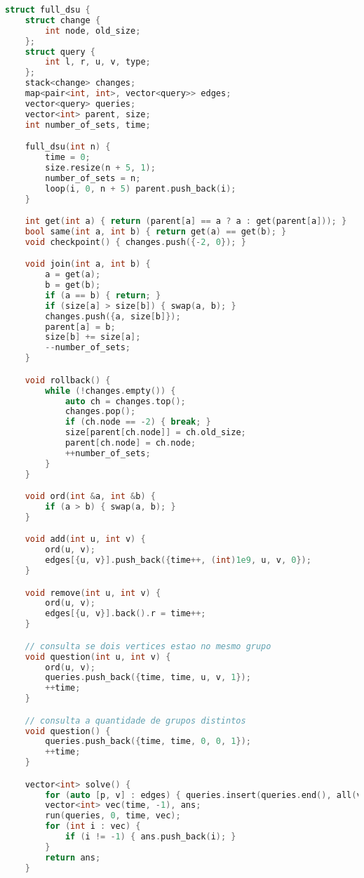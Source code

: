\documentclass[11pt, a4paper, twoside]{book}
\begin{document}
\hfill

\begin{lstlisting}[language=C++]
struct full_dsu {
    struct change {
        int node, old_size;
    };
    struct query {
        int l, r, u, v, type;
    };
    stack<change> changes;
    map<pair<int, int>, vector<query>> edges;
    vector<query> queries;
    vector<int> parent, size;
    int number_of_sets, time;

    full_dsu(int n) {
        time = 0;
        size.resize(n + 5, 1);
        number_of_sets = n;
        loop(i, 0, n + 5) parent.push_back(i);
    }

    int get(int a) { return (parent[a] == a ? a : get(parent[a])); }
    bool same(int a, int b) { return get(a) == get(b); }
    void checkpoint() { changes.push({-2, 0}); }

    void join(int a, int b) {
        a = get(a);
        b = get(b);
        if (a == b) { return; }
        if (size[a] > size[b]) { swap(a, b); }
        changes.push({a, size[b]});
        parent[a] = b;
        size[b] += size[a];
        --number_of_sets;
    }

    void rollback() {
        while (!changes.empty()) {
            auto ch = changes.top();
            changes.pop();
            if (ch.node == -2) { break; }
            size[parent[ch.node]] = ch.old_size;
            parent[ch.node] = ch.node;
            ++number_of_sets;
        }
    }

    void ord(int &a, int &b) {
        if (a > b) { swap(a, b); }
    }

    void add(int u, int v) {
        ord(u, v);
        edges[{u, v}].push_back({time++, (int)1e9, u, v, 0});
    }

    void remove(int u, int v) {
        ord(u, v);
        edges[{u, v}].back().r = time++;
    }

    // consulta se dois vertices estao no mesmo grupo
    void question(int u, int v) {
        ord(u, v);
        queries.push_back({time, time, u, v, 1});
        ++time;
    }

    // consulta a quantidade de grupos distintos
    void question() {
        queries.push_back({time, time, 0, 0, 1});
        ++time;
    }

    vector<int> solve() {
        for (auto [p, v] : edges) { queries.insert(queries.end(), all(v)); }
        vector<int> vec(time, -1), ans;
        run(queries, 0, time, vec);
        for (int i : vec) {
            if (i != -1) { ans.push_back(i); }
        }
        return ans;
    }


\end{lstlisting}
\end{document}
